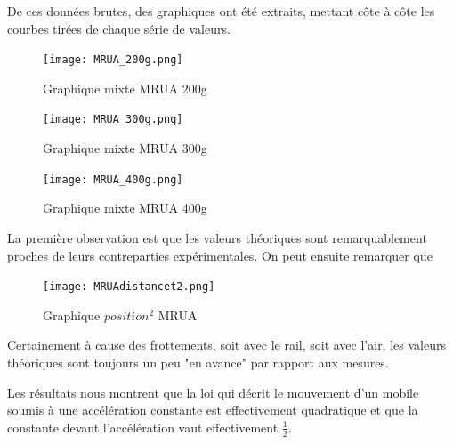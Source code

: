 \newpage

De ces données brutes, des graphiques ont été extraits, mettant côte à côte les courbes tirées de chaque série de valeurs.

\begin{figure}[h]
    \caption[Graphique mixte MRUA 200g]{Graphique mixte MRUA 200g}
    \centering
    \texttt{[image: MRUA\_200g.png]}
\end{figure}

\begin{figure}[h]
    \caption[Graphique mixte MRUA 300g]{Graphique mixte MRUA 300g}
    \centering
    \texttt{[image: MRUA\_300g.png]}
\end{figure}
\newpage

\begin{figure}[h]
    \caption[Graphique mixte MRUA 400g]{Graphique mixte MRUA 400g}
    \centering
    \texttt{[image: MRUA\_400g.png]}
\end{figure}

\newpage

La première observation est que les valeurs théoriques sont remarquablement proches de leurs contreparties expérimentales. On peut ensuite remarquer que \\

\begin{figure}
    \caption[Graphique $position^2$ MRUA]{Graphique $position^2$ MRUA}
    \centering
    \texttt{[image: MRUAdistancet2.png]}
\end{figure}

Certainement à cause des frottements, soit avec le rail, soit avec l'air, les valeurs théoriques sont toujours un peu "en avance" par rapport aux mesures.

Les résultats nous montrent que la loi qui décrit le mouvement d'un mobile soumis à une accélération constante est effectivement quadratique et que la constante devant l'accélération vaut effectivement $\frac{1}{2}$.

